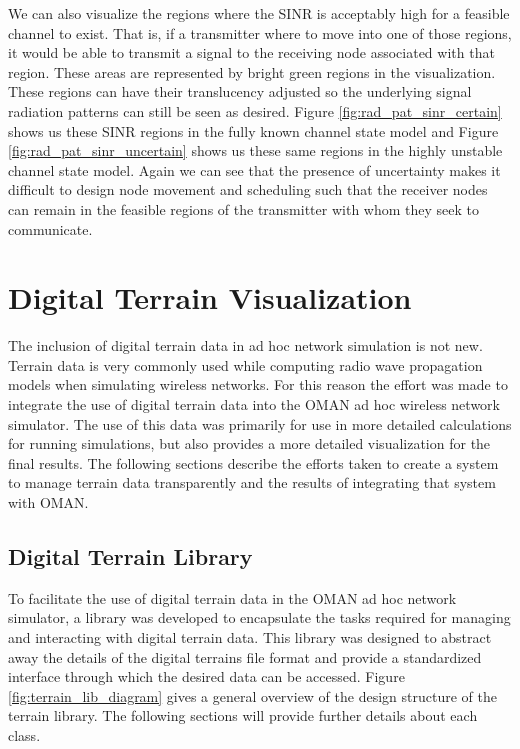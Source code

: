 We can also visualize the regions where the SINR is acceptably high for a feasible channel to exist.  That is, if a transmitter where to move into one of those regions, it would be able to transmit a signal to the receiving node associated with that region.  These areas are represented by bright green regions in the visualization.  These regions can have their translucency adjusted so the underlying signal radiation patterns can still be seen as desired.  Figure \ref{fig:rad_pat_sinr_certain} shows us these SINR regions in the fully known channel state model and Figure \ref{fig:rad_pat_sinr_uncertain} shows us these same regions in the highly unstable channel state model. Again we can see that the presence of uncertainty makes it difficult to design node movement and scheduling such that the receiver nodes can remain in the feasible regions of the transmitter with whom they seek to communicate.


\section{Digital Terrain Visualization}
The inclusion of digital terrain data in ad hoc network simulation is not new.  Terrain data is very commonly used while computing radio wave propagation models when simulating wireless networks.  For this reason the effort was made to integrate the use of digital terrain data into the OMAN ad hoc wireless network simulator.  The use of this data was primarily for use in more detailed calculations for running simulations, but also provides a more detailed visualization for the final results.  The following sections describe the efforts taken to create a system to manage terrain data transparently and the results of integrating that system with OMAN.

\subsection{Digital Terrain Library}
To facilitate the use of digital terrain data in the OMAN ad hoc network simulator, a library was developed to encapsulate the tasks required for managing and interacting with digital terrain data.  This library was designed to abstract away the details of the digital terrains file format and provide a standardized interface through which the desired data can be accessed.  Figure \ref{fig:terrain_lib_diagram} gives a general overview of the design structure of the terrain library.  The following sections will provide further details about each class.

